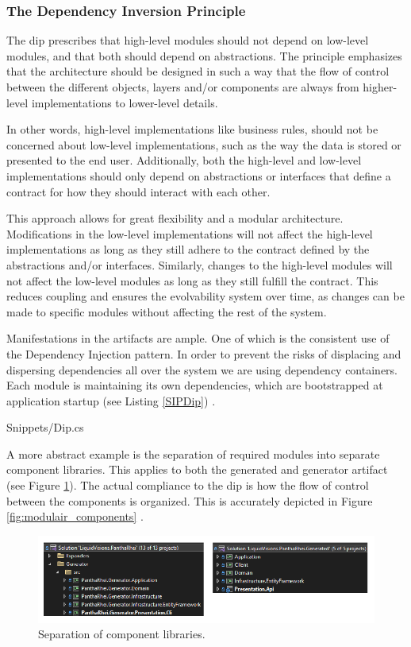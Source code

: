 \subsubsection*{The Dependency Inversion Principle} \label{subsubsec:dip}

The \gls{dip} prescribes that high-level modules should not depend on low-level modules,
and that both should depend on abstractions. The principle emphasizes that the
architecture should be designed in such a way that the flow of control between the
different objects, layers and/or components are always from higher-level implementations
to lower-level details.

In other words, high-level implementations like business rules, should not be concerned
about low-level implementations, such as the way the data is stored or presented to the
end user. Additionally, both the high-level and low-level implementations should only
depend on abstractions or interfaces that define a contract for how they should interact
with each other.

This approach allows for great flexibility and a modular architecture. Modifications in
the low-level implementations will not affect the high-level implementations as long as
they still adhere to the contract defined by the abstractions and/or interfaces.
Similarly, changes to the high-level modules will not affect the low-level modules as long
as they still fulfill the contract. This reduces coupling and ensures the evolvability
system over time, as changes can be made to specific modules without affecting the rest of
the system.

Manifestations in the artifacts are ample. One of which is the consistent use of the
Dependency Injection pattern. In order to prevent the risks of displacing and dispersing
dependencies all over the system \parencite[214]{mannaert_normalized_2016} we are using
dependency containers. Each module is maintaining its own dependencies, which are
bootstrapped at application startup (see Listing \ref{SIPDip})
\parencite{koks_generator_2023}.


    {Snippets/Dip.cs}

A more abstract example is the separation of required modules into separate component
libraries. This applies to both the generated and generator artifact (see Figure
\ref{fig:solutions}). The actual compliance to the \gls{dip} is how the flow of control
between the components is organized. This is accurately depicted in Figure
\ref{fig:modulair_components} .

\begin{figure}[H]
    \centering
    \includegraphics[width=1\textwidth]{Figures/solutions.pdf}
    \caption[modularity]{Separation of component libraries.}
    \label{fig:solutions}
\end{figure}